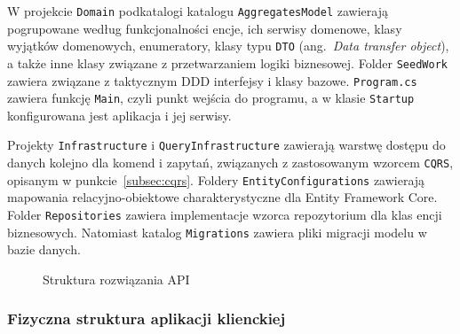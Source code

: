 W projekcie \texttt{Domain} podkatalogi katalogu \texttt{AggregatesModel} zawierają pogrupowane według funkcjonalności encje, ich serwisy domenowe, klasy wyjątków domenowych, enumeratory, klasy typu \texttt{DTO} (ang.~\emph{Data transfer object}), a także inne klasy związane z przetwarzaniem logiki biznesowej. Folder \texttt{SeedWork} zawiera związane z taktycznym DDD interfejsy i klasy bazowe. \texttt{Program.cs} zawiera funkcję \texttt{Main}, czyli punkt wejścia do programu, a w klasie \texttt{Startup} konfigurowana jest aplikacja i jej serwisy.

Projekty \texttt{Infrastructure} i \texttt{QueryInfrastructure} zawierają warstwę dostępu do danych kolejno dla komend i zapytań, związanych z zastosowanym wzorcem \texttt{CQRS}, opisanym w punkcie~\ref{subsec:cqrs}. Foldery \texttt{EntityConfigurations} zawierają mapowania relacyjno-obiektowe charakterystyczne dla Entity Framework Core. Folder \texttt{Repositories} zawiera implementacje wzorca repozytorium dla klas encji biznesowych. Natomiast katalog \texttt{Migrations} zawiera pliki migracji modelu w bazie danych.

\begin{figure}[t]
	\centering
	\caption{Struktura rozwiązania API}
	\label{fig:fiz-api-2}
\end{figure}

\subsubsection{Fizyczna struktura aplikacji klienckiej}

